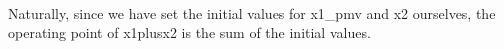 \setlength\fboxsep{0pt}
\setlength\fboxrule{0.5pt}
\\\newline
Naturally, since we have set the initial values for x1\_pmv and x2 ourselves, the operating point of x1plusx2 is the sum of the initial values.

